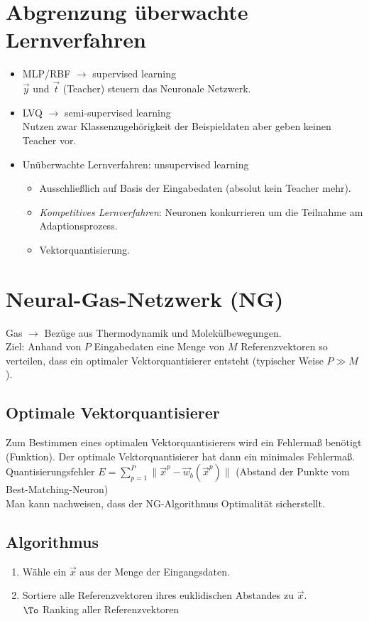 \section{Abgrenzung überwachte Lernverfahren}
\begin{itemize}
\item MLP/RBF $\to$ supervised learning\\
$\vec{y}$ und $\vec{t}$ (Teacher) steuern das Neuronale Netzwerk.
\item LVQ $\to$ semi-supervised learning\\
Nutzen zwar Klassenzugehörigkeit der Beispieldaten aber geben keinen Teacher vor.
\item Unüberwachte Lernverfahren: unsupervised learning
\begin{itemize}
\item Ausschließlich auf Basis der Eingabedaten (absolut kein Teacher mehr).
\item \emph{Kompetitives Lernverfahren}: Neuronen konkurrieren um die Teilnahme am Adaptionsprozess.
\item Vektorquantisierung.
\end{itemize}
\end{itemize}

\section{Neural-Gas-Netzwerk (NG)}
Gas $\to$ Bezüge aus Thermodynamik und Molekülbewegungen.\\
Ziel: Anhand von $P$ Eingabedaten eine Menge von $M$ Referenzvektoren so verteilen, dass ein optimaler Vektorquantisierer entsteht (typischer Weise $P \gg M$).

\subsection{Optimale Vektorquantisierer}
Zum Bestimmen eines optimalen Vektorquantisierers wird ein Fehlermaß benötigt (Funktion). Der optimale Vektorquantisierer hat dann ein minimales Fehlermaß.\\
Quantisierungsfehler $E = \sum_{p=1}^P \| \vec{x}^p-\vec{w}_b(\vec{x}^p)\|$ (Abstand der Punkte vom Best-Matching-Neuron)\\
Man kann nachweisen, dass der NG-Algorithmus Optimalität sicherstellt.

\subsection{Algorithmus}
\begin{enumerate}
\item Wähle ein $\vec{x}$ aus der Menge der Eingangsdaten.
\item Sortiere alle Referenzvektoren ihres euklidischen Abstandes zu $\vec{x}$.\\
$\To$ Ranking aller Referenzvektoren 
\end{enumerate}







